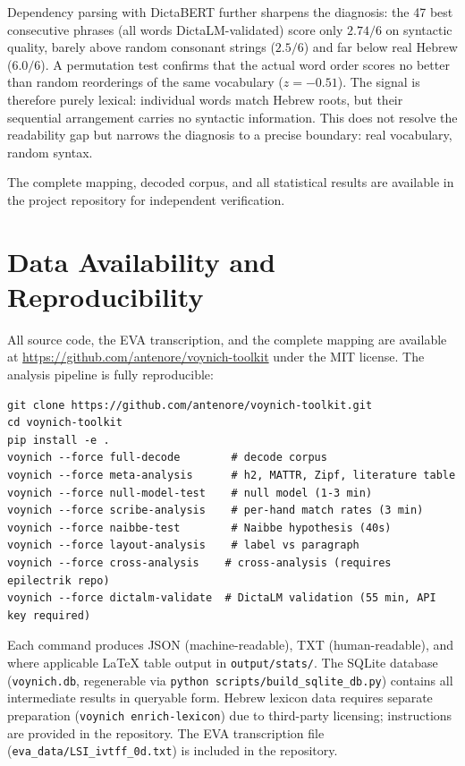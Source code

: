 \documentclass[11pt,a4paper]{article}
\begin{document}
Dependency parsing with DictaBERT further sharpens the diagnosis: the 47
best consecutive phrases (all words DictaLM-validated) score only $2.74/6$
on syntactic quality, barely above random consonant strings ($2.5/6$) and
far below real Hebrew ($6.0/6$). A permutation test confirms that the
actual word order scores no better than random reorderings of the same
vocabulary ($z=-0.51$). The signal is therefore purely lexical: individual
words match Hebrew roots, but their sequential arrangement carries no
syntactic information. This does not resolve the readability gap but
narrows the diagnosis to a precise boundary: real vocabulary, random syntax.

The complete mapping, decoded corpus, and all statistical results are
available in the project repository for independent verification.

\section*{Data Availability and Reproducibility}

All source code, the EVA transcription, and the complete mapping are
available at
\url{https://github.com/antenore/voynich-toolkit}
under the MIT license. The analysis pipeline is fully reproducible:

\begin{verbatim}
git clone https://github.com/antenore/voynich-toolkit.git
cd voynich-toolkit
pip install -e .
voynich --force full-decode        # decode corpus
voynich --force meta-analysis      # h2, MATTR, Zipf, literature table
voynich --force null-model-test    # null model (1-3 min)
voynich --force scribe-analysis    # per-hand match rates (3 min)
voynich --force naibbe-test        # Naibbe hypothesis (40s)
voynich --force layout-analysis    # label vs paragraph
voynich --force cross-analysis    # cross-analysis (requires epilectrik repo)
voynich --force dictalm-validate  # DictaLM validation (55 min, API key required)
\end{verbatim}

Each command produces JSON (machine-readable), TXT (human-readable), and
where applicable LaTeX table output in \texttt{output/stats/}. The SQLite
database (\texttt{voynich.db}, regenerable via
\texttt{python scripts/build\_sqlite\_db.py}) contains all intermediate
results in queryable form. Hebrew lexicon data requires separate
preparation (\texttt{voynich enrich-lexicon}) due to third-party licensing;
instructions are provided in the repository. The EVA transcription file
(\texttt{eva\_data/LSI\_ivtff\_0d.txt}) is included in the repository.
\end{document}
